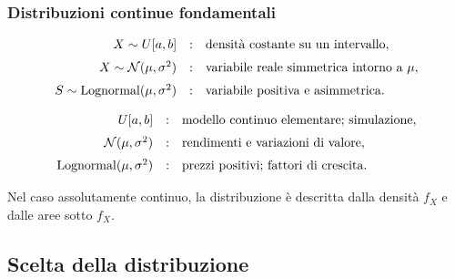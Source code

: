\documentclass[handout]{beamer}%
\providecommand{\1}{\mathbf{1}}
\providecommand{\QTR}[2]{\csname #1\endcsname{#2}}
\begin{document}
\begin{frame}%
%

\frametitle{Distribuzioni continue fondamentali}%
%

\[%
\begin{array}
[c]{rcl}%
X\sim U[a,b] & : & \mbox{densit\`{a} costante su un intervallo},\\[6pt]%
X\sim\mathcal{N}(\mu,\sigma^{2}) & : &
\mbox{variabile reale simmetrica intorno a } \mu,\\[6pt]%
S\sim\operatorname{Lognormal}(\mu,\sigma^{2}) & : &
\mbox{variabile positiva e asimmetrica}.
\end{array}
\]


\medskip%

\[%
\begin{array}
[c]{rcl}%
U[a,b] & : & \mbox{modello continuo elementare; simulazione},\\[6pt]%
\mathcal{N}(\mu,\sigma^{2}) & : &
\mbox{rendimenti e variazioni di valore},\\[6pt]%
\operatorname{Lognormal}(\mu,\sigma^{2}) & : &
\mbox{prezzi positivi; fattori di crescita}.
\end{array}
\]


\medskip

Nel caso assolutamente continuo, la distribuzione \`{e} descritta dalla
densit\`{a} $f_{X}$ e dalle aree sotto $f_{X}$.%

\transboxout
\end{frame}%




\subsection{Scelta della distribuzione}%
\end{document}

